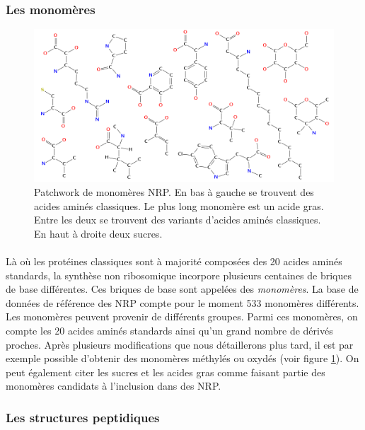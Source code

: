 \documentclass[12pt,french,twoside]{report}
\begin{document}
\subsubsection{Les monomères}

\begin{figure}[h!]
  \begin{center}
    \includegraphics[width=450px]{Figures/bio/Intro/monos/monos.png}
    \caption{\label{monomers_example}Patchwork de monomères NRP.
    En bas à gauche se trouvent des acides aminés classiques.
    Le plus long monomère est un acide gras.
    Entre les deux se trouvent des variants d'acides aminés classiques.
    En haut à droite deux  sucres.}
  \end{center}
\end{figure}

\paragraph{}Là où les protéines classiques sont à majorité composées des 20 acides aminés standards, la synthèse non ribosomique incorpore plusieurs centaines de briques de base différentes.
Ces briques de base sont appelées des {\em monomères}.
La base de données de référence des NRP compte pour le moment 533 monomères différents.
Les monomères peuvent provenir de différents groupes.
Parmi ces monomères, on compte les 20 acides aminés standards ainsi qu'un grand nombre de dérivés proches.
Après plusieurs modifications que nous détaillerons plus tard, il est par exemple possible d'obtenir des monomères méthylés ou oxydés (voir figure \ref{monomers_example}).
On peut également citer les sucres et les acides gras comme faisant partie des monomères candidats à l'inclusion dans des NRP.


\subsubsection{Les structures peptidiques}
\end{document}
